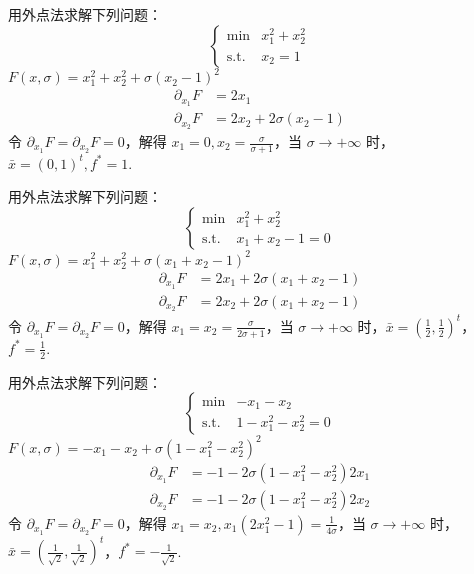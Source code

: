 

\newcommand\Title{最优化方法第12次作业}

\newcommand\subject{\operatorname{s.t.}}

\renewcommand{\labelenumi}{(\arabic*)}


\begin{problem}[P413 1.(1)]
    用外点法求解下列问题：\[\begin{cases}
        \min &x_1^2 + x_2^2\\
        \subject & x_2 = 1
    \end{cases}\]
    \Answer $F(x, \sigma) = x_1^2 + x_2^2 + \sigma(x_2 - 1)^2$
    \begin{align*}
        \partial_{x_1}F &= 2x_1\\
        \partial_{x_2}F &= 2x_2 + 2\sigma (x_2 - 1)
    \end{align*}
    令 $\partial_{x_1}F = \partial_{x_2}F = 0$，解得 $x_1 = 0, x_2 = \frac{\sigma}{\sigma + 1}$，当 $\sigma \to +\infty$ 时，$\bar{x} = (0, 1)^t, f^* = 1$.
\end{problem}

\begin{problem}[P413 1.(2)]
    用外点法求解下列问题：\[\begin{cases}
        \min &x_1^2 + x_2^2\\
        \subject & x_1 + x_2 - 1 = 0
    \end{cases}\]
    \Answer $F(x, \sigma) = x_1^2 + x_2^2 + \sigma(x_1 + x_2 - 1)^2$
    \begin{align*}
        \partial_{x_1}F &= 2x_1 + 2\sigma(x_1 + x_2 - 1)\\
        \partial_{x_2}F &= 2x_2 + 2\sigma(x_1 + x_2 - 1)
    \end{align*}
    令 $\partial_{x_1}F = \partial_{x_2}F = 0$，解得 $x_1 = x_2 = \frac{\sigma}{2\sigma + 1}$，当 $\sigma \to +\infty$ 时，$\bar{x} = (\frac{1}{2}, \frac{1}{2})^t$，$f^* = \frac{1}{2}$.
\end{problem}

\begin{problem}[P413 1.(3)]
    用外点法求解下列问题：\[\begin{cases}
        \min &-x_1 - x_2\\
        \subject & 1 - x_1^2 - x_2^2 = 0
    \end{cases}\]
    \Answer $F(x, \sigma) = -x_1 - x_2 + \sigma(1 - x_1^2 - x_2^2)^2$
    \begin{align*}
        \partial_{x_1}F &= -1 - 2\sigma(1 - x_1^2 - x_2^2)2x_1\\
        \partial_{x_2}F &= -1 - 2\sigma(1 - x_1^2 - x_2^2)2x_2
    \end{align*} 
    令 $\partial_{x_1}F = \partial_{x_2}F = 0$，解得 $x_1 = x_2, x_1(2x_1^2 - 1) = \frac{1}{4\sigma}$，当 $\sigma \to +\infty$ 时，$\bar{x} = (\frac{1}{\sqrt{2}}, \frac{1}{\sqrt{2}})^t$，$f^* = -\frac{1}{\sqrt{2}}$.
\end{problem}

